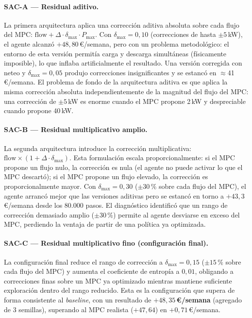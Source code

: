 \documentclass[12pt, a4paper, twoside]{report}
\begin{document}
\paragraph{SAC-A — Residual aditivo.}
La primera arquitectura aplica una corrección aditiva absoluta sobre cada flujo
del MPC: $\text{flow} + \Delta \cdot \delta_{\max} \cdot P_{\max}$. Con
$\delta_{\max} = 0{,}10$ (correcciones de hasta $\pm5$\,kW), el agente alcanzó
$+48{,}80$\,€/semana, pero con un problema metodológico: el entorno de esta
versión permitía carga y descarga simultáneas (físicamente imposible), lo que
inflaba artificialmente el resultado. Una versión corregida con neteo y
$\delta_{\max} = 0{,}05$ produjo correcciones insignificantes y se estancó en
$\approx$41\,€/semana. El problema de fondo de la arquitectura aditiva es que
aplica la misma corrección absoluta independientemente de la magnitud del flujo
del MPC: una corrección de $\pm5$\,kW es enorme cuando el MPC propone 2\,kW y
despreciable cuando propone 40\,kW.

\paragraph{SAC-B — Residual multiplicativo amplio.}
La segunda arquitectura introduce la corrección multiplicativa:
$\text{flow} \times (1 + \Delta \cdot \delta_{\max})$. Esta formulación escala
proporcionalmente: si el MPC propone un flujo nulo, la corrección es nula (el
agente no puede activar lo que el MPC descartó); si el MPC propone un flujo
elevado, la corrección es proporcionalmente mayor. Con $\delta_{\max} = 0{,}30$
($\pm30\,\%$ sobre cada flujo del MPC), el agente arrancó mejor que las
versiones aditivas pero se estancó en torno a $+43{,}3$\,€/semana desde los
80.000 pasos. El diagnóstico identificó que un rango de corrección demasiado
amplio ($\pm30\,\%$) permite al agente desviarse en exceso del MPC, perdiendo la
ventaja de partir de una política ya optimizada.

\paragraph{SAC-C — Residual multiplicativo fino (configuración final).}
La configuración final reduce el rango de corrección a $\delta_{\max} = 0{,}15$
($\pm15\,\%$ sobre cada flujo del MPC) y aumenta el coeficiente de entropía a
$0{,}01$, obligando a correcciones finas sobre un MPC ya optimizado mientras
mantiene suficiente exploración dentro del rango reducido. Esta es la
configuración que supera de forma consistente al \textit{baseline}, con un
resultado de \textbf{$+48{,}35$\,€/semana} (agregado de 3 semillas), superando
al MPC realista ($+47{,}64$) en $+0{,}71$\,€/semana.
\end{document}
